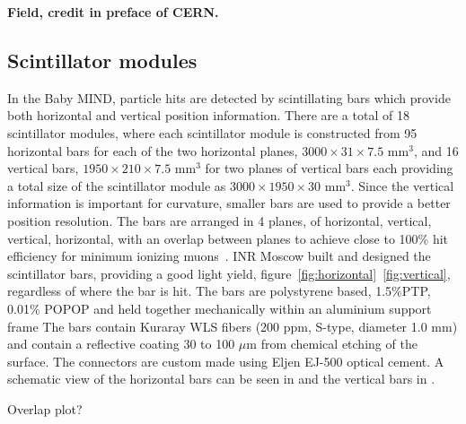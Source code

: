\textbf{Field, credit in preface of CERN.}
\subsection{Scintillator modules}
In the Baby MIND, particle hits are detected by scintillating bars which provide both horizontal and vertical position information. There are a total of 18 scintillator modules, where each scintillator module is constructed from 95 horizontal bars for each of the two horizontal planes, $3000 \times 31 \times 7.5$ mm$^3$, and 16 vertical bars, $1950 \times 210 \times 7.5$ mm$^3$ for two planes of vertical bars each providing a total size of the scintillator module as $3000 \times 1950 \times 30$ mm$^3$. Since the vertical information is important for curvature, smaller bars are used to provide a better position resolution. The bars are arranged in 4 planes, of horizontal, vertical, vertical, horizontal, with an overlap between planes to achieve close to 100\% hit efficiency for minimum ionizing muons~\cite{51Saba}. INR Moscow built and designed the scintillator bars, providing a good light yield, figure~\ref{fig:horizontal}~\ref{fig:vertical}, regardless of where the bar is hit. The bars are polystyrene based, 1.5\%PTP, 0.01\% POPOP and held together mechanically within an aluminium support frame  The bars contain Kuraray WLS fibers (200 ppm, S-type, diameter 1.0 mm) and contain a reflective coating 30 to 100 $\mu$m from chemical etching of the surface. The connectors are custom made using Eljen EJ-500 optical cement. A schematic view of the horizontal bars can be seen in  and the vertical bars in . 


Overlap plot?



